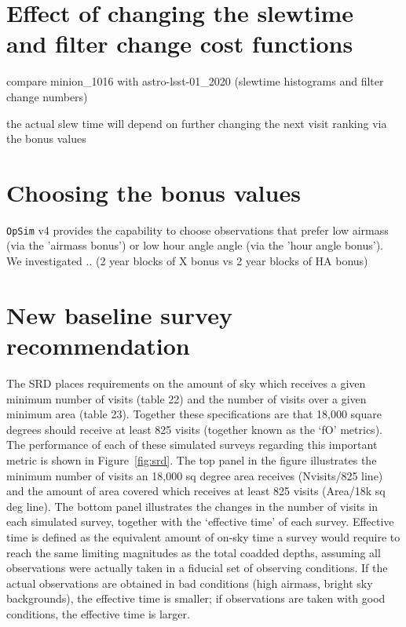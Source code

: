 \documentclass[DM,lsstdraft,authoryear,toc]{lsstdoc}
\newcommand{\opsim}{\texttt{OpSim}\xspace}
\begin{document}
\section{Effect of changing the slewtime and filter change cost functions}

compare minion\_1016 with astro-lsst-01\_2020 (slewtime histograms and filter change numbers)

the actual slew time will depend on further changing the next visit ranking via the bonus values

\section{Choosing the bonus values} 

\opsim v4 provides the capability to choose observations that prefer low airmass (via the 'airmass bonus') or low hour angle angle (via the 'hour angle bonus'). We investigated ..
(2 year blocks of X bonus vs 2 year blocks of HA bonus)


\section{New baseline survey recommendation}

The SRD places requirements on the amount of sky which receives a given minimum number of visits (table 22) and the number of visits over a given minimum area (table 23). Together these specifications are that 18,000 square degrees should receive at least 825 visits (together known as the `fO' metrics). The performance of each of these simulated surveys regarding this important metric is shown in Figure~\ref{fig:srd}. The top panel in the figure illustrates the minimum number of visits an 18,000 sq degree area receives (Nvisits/825 line) and the amount of area covered which receives at least 825 visits (Area/18k sq deg line).  The bottom panel illustrates the changes in the number of visits in each simulated survey, together with the `effective time' of each survey. Effective time is defined as the equivalent amount of on-sky time a survey would require to reach the same limiting magnitudes as the total coadded depths, assuming all observations were actually taken in a fiducial set of observing conditions. If the actual observations are obtained in bad conditions (high airmass, bright sky backgrounds), the effective time is smaller; if observations are taken with good conditions, the effective time is larger.
\end{document}
